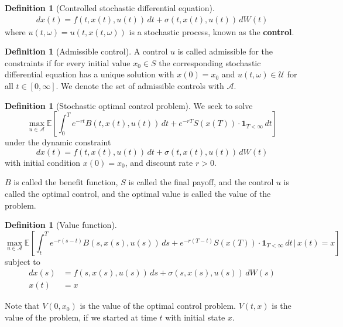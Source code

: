 \documentclass[10pt, oneside, reqno]{amsart}
\theoremstyle{plain}%
\numberwithin{equation}{section}
\theoremstyle{definition}
\newtheorem{defn}[thm]{Definition}
\theoremstyle{remark}
\newcommand{\given}{ \, | \,}
\newcommand{\E}{\mathbb{E}}
\begin{document}
\begin{defn}[Controlled stochastic differential equation]
    \begin{align*}
        dx(t) = f(t, x(t), u(t)) \, dt + \sigma(t,x(t), u(t)) \, dW(t)
    \end{align*} where $u(t, \omega) = u(t, x(t, \omega))$ is a stochastic process, known as the \textbf{control}.  
\end{defn}

\begin{defn}[Admissible control]
    A control $u$ is called admissible for the constraints if for every initial value $x_0 \in S$ the corresponding stochastic differential equation has a unique solution with $x(0) = x_0$ and $u(t, \omega) \in \mathcal U$ for all $t \in [0, \infty]$.  We denote the set of admissible controls with $\mathcal A$.  
\end{defn}

\begin{defn}[Stochastic optimal control problem]
    We seek to solve \[
        \max_{u \in \mathcal A} \E \left[ \int_0^T e^{-rt} B(t, x(t), u(t)) \, dt + e^{-rT}S(x(T)) \cdot \mathbf{1}_{T < \infty} \, dt\right]
    \] under the dynamic constraint \[
        dx(t) = f(t, x(t), u(t)) \, dt + \sigma(t, x(t), u(t)) \, dW(t)
    \] with initial condition $x(0) = x_0$, and discount rate $r > 0$.  
    
    $B$ is called the benefit function, $S$ is called the final payoff, and the control $u$ is called the optimal control, and the optimal value is called the value of the problem.
\end{defn}

\begin{defn}[Value function] \[
    \max_{u \in \mathcal A} \E \left[ \int_t^T e^{-r(s-t)} B(s, x(s), u(s)) \, ds + e^{-r(T-t)}S(x(T)) \cdot \mathbf{1}_{T < \infty} \, dt \given x(t) = x \right]
    \] subject to \begin{align*}
        dx(s) &= f(s, x(s), u(s)) \, ds + \sigma(s, x(s), u(s)) \, dW(s) \\
        x(t) &= x
    \end{align*}  
    
    Note that $V(0, x_0)$ is the value of the optimal control problem. $V(t, x)$ is the value of the problem, if we started at time $t$ with initial state $x$.  
\end{defn}
\end{document}
